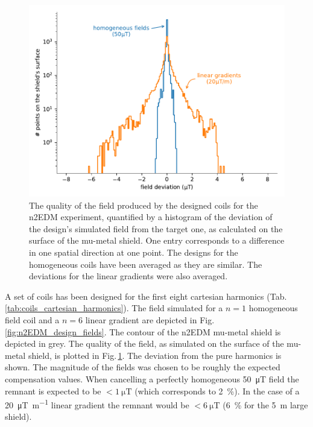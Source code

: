 \begin{figure}
  \centering
  \includegraphics[width=\linewidth]{gfx/prototype/n2EDM_coils_field.pdf}
  \caption{The quality of the field produced by the designed coils for the n2EDM experiment, quantified by a histogram of the deviation of the design's simulated field from the target one, as calculated on the surface of the mu-metal shield.
  One entry corresponds to a difference in one spatial direction at one point.
  The designs for the homogeneous coils have been averaged as they are similar. The deviations for the linear gradients were also averaged.
  }\label{fig:n2EDM_design_deviation}
\end{figure}

A set of coils has been designed for the first eight cartesian harmonics (Tab.\,\ref{tab:coils_cartesian_harmonics}).
The field simulated for a $n = 1$ homogeneous field coil and a $n = 6$ linear gradient are depicted in Fig.\,\ref{fig:n2EDM_design_fields}.
The contour of the n2EDM mu-metal shield is depicted in grey.
The quality of the field, as simulated on the surface of the mu-metal shield, is plotted in Fig.\,\ref{fig:n2EDM_design_deviation}.
The deviation from the pure harmonics is shown.
The magnitude of the fields was chosen to be roughly the expected compensation values.
When cancelling a perfectly homogeneous \SI{50}{\micro\tesla} field the remnant is expected to be $< \SI{1}{\micro\tesla}$ (which corresponds to \SI{2}{\percent}).
In the case of a \SI{20}{\micro\tesla\per\meter} linear gradient the remnant would be $< \SI{6}{\micro\tesla}$ (\SI{6}{\percent} for the \SI{5}{\metre} large shield).

